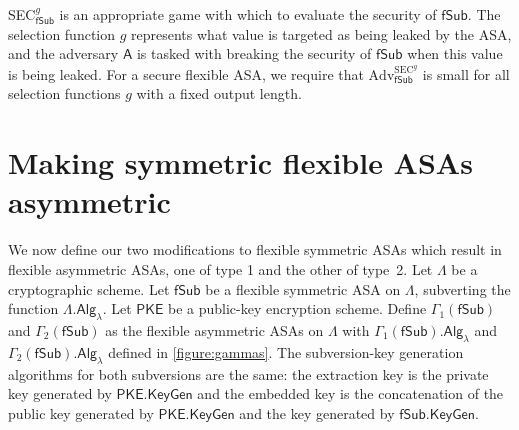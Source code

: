 SEC$^g_\mathsf{fSub}$ is an appropriate game with which to evaluate the security of $\mathsf{fSub}$. The selection function $g$ represents what value is targeted as being leaked by the ASA, and the adversary $\mathsf{A}$ is tasked with breaking the security of $\mathsf{fSub}$ when this value is being leaked. For a secure flexible ASA, we require that $\mathrm{Adv}^{\mathrm{SEC}^g}_\mathsf{fSub}$ is small for all selection functions $g$ with a fixed output length.

\section{Making symmetric flexible ASAs asymmetric}
We now define our two modifications to flexible symmetric ASAs which result in flexible asymmetric ASAs, one of type 1 and the other of type~2. Let $\mathsf{\Lambda}$ be a cryptographic scheme. Let $\mathsf{fSub}$ be a flexible symmetric ASA on $\mathsf{\Lambda}$, subverting the function $\mathsf{\Lambda.Alg}_\lambda$. Let $\mathsf{PKE}$ be a public-key encryption scheme. Define $\Gamma_1(\mathsf{fSub})$ and $\Gamma_2(\mathsf{fSub})$ as the flexible asymmetric ASAs on $\mathsf{\Lambda}$ with $\Gamma_1(\mathsf{fSub}).\mathsf{Alg}_\lambda$ and $\Gamma_2(\mathsf{fSub}).\mathsf{Alg}_\lambda$ defined in \autoref{figure:gammas}. The subversion-key generation algorithms for both subversions are the same: the extraction key is the private key generated by $\mathsf{PKE.KeyGen}$ and the embedded key is the concatenation of the public key generated by $\mathsf{PKE.KeyGen}$ and the key generated by $\mathsf{fSub.KeyGen}$.

